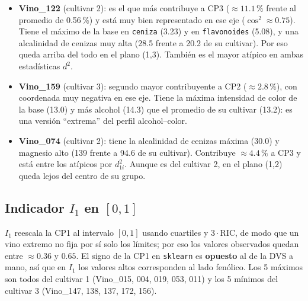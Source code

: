 \documentclass[11pt,a4paper]{article}
\newcommand{\var}[1]{\texttt{#1}}
\begin{document}
\begin{itemize}[leftmargin=*]
  \item \textbf{Vino\_122} (cultivar 2): es el que más contribuye a CP3 ($\approx 11.1\,\%$ frente al promedio de 0.56\,\%) y está muy bien representado en ese eje ($\cos^2 \approx 0.75$). Tiene el máximo de la base en \var{ceniza} (3.23) y en \var{flavonoides} (5.08), y una alcalinidad de cenizas muy alta (28.5 frente a 20.2 de su cultivar). Por eso queda arriba del todo en el plano (1,3). También es el mayor atípico en ambas estadísticas $d^2$.
  \item \textbf{Vino\_159} (cultivar 3): segundo mayor contribuyente a CP2 ($\approx 2.8\,\%$), con coordenada muy negativa en ese eje. Tiene la máxima intensidad de color de la base (13.0) y más alcohol (14.3) que el promedio de su cultivar (13.2): es una versión ``extrema'' del perfil alcohol--color.
  \item \textbf{Vino\_074} (cultivar 2): tiene la alcalinidad de cenizas máxima (30.0) y magnesio alto (139 frente a 94.6 de su cultivar). Contribuye $\approx 4.4\,\%$ a CP3 y está entre los atípicos por $d^2_{1i}$. Aunque es del cultivar 2, en el plano (1,2) queda lejos del centro de su grupo.
\end{itemize}

\subsection*{Indicador $I_1$ en $[0,1]$}

$I_1$ reescala la CP1 al intervalo $[0,1]$ usando cuartiles y $3\cdot\mathrm{RIC}$, de modo que un vino extremo no fija por sí solo los límites; por eso los valores observados quedan entre $\approx 0.36$ y $0.65$. El signo de la CP1 en \texttt{sklearn} es \textbf{opuesto} al de la DVS a mano, así que en $I_1$ los valores altos corresponden al lado fenólico. Los 5 máximos son todos del cultivar 1 (Vino\_015, 004, 019, 053, 011) y los 5 mínimos del cultivar 3 (Vino\_147, 138, 137, 172, 156).
\end{document}
